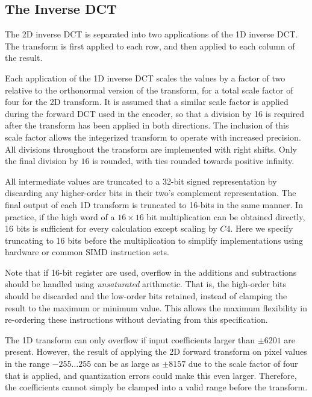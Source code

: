 \documentclass[9pt,letterpaper]{book}
\numberwithin{equation}{chapter}
\numberwithin{figure}{chapter}
\numberwithin{table}{chapter}
\begin{document}
\subsection{The Inverse DCT}

The 2D inverse DCT is separated into two applications of the 1D inverse DCT.
The transform is first applied to each row, and then applied to each column of
 the result.

Each application of the 1D inverse DCT scales the values by a factor of two
 relative to the orthonormal version of the transform, for a total scale factor
 of four for the 2D transform.
It is assumed that a similar scale factor is applied during the forward DCT
 used in the encoder, so that a division by 16 is required after the transform
 has been applied in both directions.
The inclusion of this scale factor allows the integerized transform to operate
 with increased precision.
All divisions throughout the transform are implemented with right shifts.
Only the final division by $16$ is rounded, with ties rounded towards positive
 infinity.

All intermediate values are truncated to a 32-bit signed representation by
 discarding any higher-order bits in their two's complement representation.
The final output of each 1D transform is truncated to 16-bits in the same
 manner.
In practice, if the high word of a $16\times 16$ bit multiplication can be
 obtained directly, 16 bits is sufficient for every calculation except scaling
 by $C4$.
Here we specify truncating to 16 bits before the multiplication to simplify
 implementations using hardware or common SIMD instruction sets.

Note that if 16-bit register are used, overflow in the additions and
 subtractions should be handled using \textit{unsaturated} arithmetic.
That is, the high-order bits should be discarded and the low-order bits
 retained, instead of clamping the result to the maximum or minimum value.
This allows the maximum flexibility in re-ordering these instructions without
 deviating from this specification.

The 1D transform can only overflow if input coefficients larger than $\pm 6201$
 are present.
However, the result of applying the 2D forward transform on pixel values in the
 range $-255\ldots 255$ can be as large as $\pm 8157$ due to the scale factor
 of four that is applied, and quantization errors could make this even larger.
Therefore, the coefficients cannot simply be clamped into a valid range before
 the transform.
\end{document}

